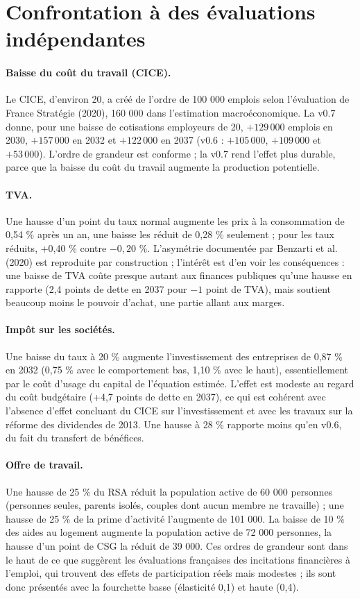 \section{Confrontation à des évaluations indépendantes}

\paragraph{Baisse du coût du travail (CICE).} Le CICE, d'environ 20\md, a créé de l'ordre de 100 000 emplois selon
l'évaluation de France Stratégie (2020), 160 000 dans l'estimation macroéconomique. La v0.7 donne, pour une baisse de
cotisations employeurs de 20\md, $+129\,000$ emplois en 2030, $+157\,000$ en 2032 et $+122\,000$ en 2037 (v0.6 :
$+105\,000$, $+109\,000$ et $+53\,000$). L'ordre de grandeur est conforme ; la v0.7 rend l'effet plus durable, parce
que la baisse du coût du travail augmente la production potentielle.

\paragraph{TVA.} Une hausse d'un point du taux normal augmente les prix à la consommation de 0,54 \% après un an,
une baisse les réduit de 0,28 \% seulement ; pour les taux réduits, +0,40 \% contre $-0{,}20$ \%. L'asymétrie
documentée par Benzarti et al. (2020) est reproduite par construction ; l'intérêt est d'en voir les conséquences :
une baisse de TVA coûte presque autant aux finances publiques qu'une hausse en rapporte (2,4 points de dette en 2037
pour $-1$ point de TVA), mais soutient beaucoup moins le pouvoir d'achat, une partie allant aux marges.

\paragraph{Impôt sur les sociétés.} Une baisse du taux à 20 \% augmente l'investissement des entreprises de 0,87 \%
en 2032 (0,75 \% avec le comportement bas, 1,10 \% avec le haut), essentiellement par le coût d'usage du capital de
l'équation estimée. L'effet est modeste au regard du coût budgétaire (+4,7 points de dette en 2037), ce qui est
cohérent avec l'absence d'effet concluant du CICE sur l'investissement et avec les travaux sur la réforme des
dividendes de 2013. Une hausse à 28 \% rapporte moins qu'en v0.6, du fait du transfert de bénéfices.

\paragraph{Offre de travail.} Une hausse de 25 \% du RSA réduit la population active de 60 000 personnes (personnes
seules, parents isolés, couples dont aucun membre ne travaille) ; une hausse de 25 \% de la prime d'activité
l'augmente de 101 000. La baisse de 10 \% des aides au logement augmente la population active de 72 000 personnes, la
hausse d'un point de CSG la réduit de 39 000. Ces ordres de grandeur sont dans le haut de ce que suggèrent les
évaluations françaises des incitations financières à l'emploi, qui trouvent des effets de participation réels mais
modestes ; ils sont donc présentés avec la fourchette basse (élasticité 0,1) et haute (0,4).

